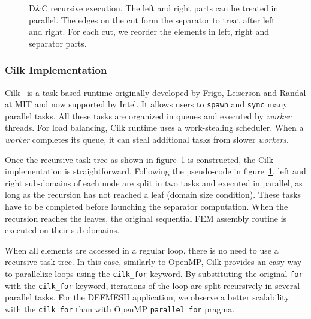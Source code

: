 \documentclass[10pt]{IOS-Book-Article}
\begin{document}
\begin{figure}[htp]

\caption{D\&C recursive execution. The left and right parts can be treated in parallel. The edges on the cut form the separator to treat after left and right. For each cut, we reorder the elements in left, right and separator parts.}
\label{fig:DCrec}
\end{figure}

\subsubsection{Cilk Implementation}
Cilk~\cite{cilk5} is a task based runtime originally developed by Frigo, Leiserson and Randal at MIT and now supported by Intel.
It allows users to {\tt spawn} and {\tt sync} many parallel tasks.
All these tasks are organized in queues and executed by \emph{worker} threads.
For load balancing, Cilk runtime uses a work-stealing scheduler. When a \emph{worker} completes its queue, it can steal additional tasks from slower \emph{workers}.

Once the recursive task tree as shown in figure~\ref{fig:DCrec} is constructed, the Cilk implementation is straightforward.
Following the pseudo-code in figure~\ref{fig:DCrec}, left and right sub-domains of each node are split in two tasks and executed in parallel, as long as the recursion has not reached a leaf (domain size condition).
These tasks have to be completed before launching the separator computation. 
When the recursion reaches the leaves, the original sequential FEM assembly routine is executed on their sub-domains.

When all elements are accessed in a regular loop, there is no need to use a recursive task tree.
In this case, similarly to OpenMP, Cilk provides an easy way to parallelize loops using the { \tt cilk\_for} keyword.
By substituting the original {\tt for} with the {\tt cilk\_for} keyword, iterations of the loop are split recursively in several parallel tasks.
For the DEFMESH application, we observe a better scalability with the {\tt cilk\_for} than with OpenMP {\tt parallel for} pragma.
\end{document}
